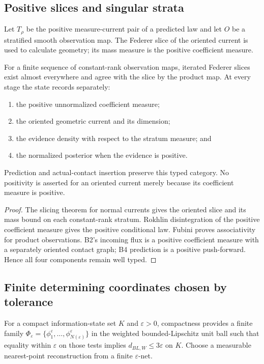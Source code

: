 \subsection{Positive slices and singular strata}

Let \(T_\rho\) be the positive measure-current pair of a predicted law and let
\(O\) be a stratified smooth observation map.  The Federer slice of the
oriented current is used to calculate geometry; its mass measure is the
positive coefficient measure.

\begin{theorem}
\label{thm:r16-c1-slices}
For a finite sequence of constant-rank observation maps, iterated Federer
slices exist almost everywhere and agree with the slice by the product map.
At every stage the state records separately:
\begin{enumerate}[label=(\roman*)]
\item the positive unnormalized coefficient measure;
\item the oriented geometric current and its dimension;
\item the evidence density with respect to the stratum measure; and
\item the normalized posterior when the evidence is positive.
\end{enumerate}
Prediction and actual-contact insertion preserve this typed category.  No
positivity is asserted for an oriented current merely because its coefficient
measure is positive.
\end{theorem}

\begin{proof}
The slicing theorem for normal currents gives the oriented slice and its mass
bound on each constant-rank stratum.  Rokhlin disintegration of the positive
coefficient measure gives the positive conditional law.  Fubini proves
associativity for product observations.  B2's incoming flux is a positive
coefficient measure with a separately oriented contact graph; B4 prediction
is a positive push-forward.  Hence all four components remain well typed.
\end{proof}

\subsection{Finite determining coordinates chosen by tolerance}

For a compact information-state set \(K\) and \(\varepsilon>0\), compactness
provides a finite family
\(\Phi_\varepsilon=\{\phi_1^\varepsilon,\ldots,
\phi_{N(\varepsilon)}^\varepsilon\}\) in the weighted bounded-Lipschitz unit
ball such that equality within \(\varepsilon\) on those tests implies
\(d_{BL,W}\le3\varepsilon\) on \(K\).  Choose a measurable nearest-point
reconstruction from a finite \(\varepsilon\)-net.

